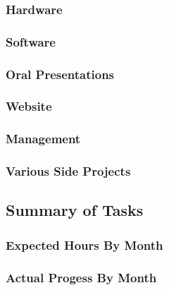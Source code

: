 \documentclass[ppfs.tex]{template/subfiles}
\begin{document}
\subsubsection{Hardware}
\subsubsection{Software}
\subsubsection{Oral Presentations}
\subsubsection{Website}
\subsubsection{Management}
\subsubsection{Various Side Projects}


\subsection{Summary of Tasks}


\subsubsection{Expected Hours By Month}


\subsubsection{Actual Progess By Month}

\end{document}
